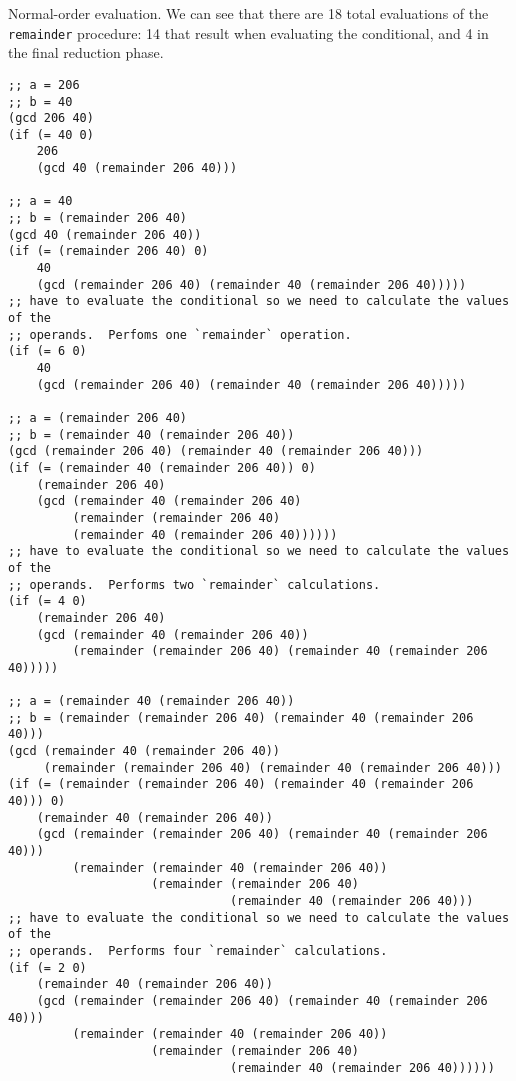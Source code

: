 \documentclass{article}
\begin{document}
\noindent Normal-order evaluation.  We can see that there are 18 total
evaluations of the \lstinline{remainder} procedure: 14 that result when
evaluating the conditional, and 4 in the final reduction phase.
\begin{lstlisting}[style=scheme]
;; a = 206
;; b = 40
(gcd 206 40)
(if (= 40 0)
    206
    (gcd 40 (remainder 206 40)))

;; a = 40
;; b = (remainder 206 40)
(gcd 40 (remainder 206 40))
(if (= (remainder 206 40) 0)
    40
    (gcd (remainder 206 40) (remainder 40 (remainder 206 40)))))
;; have to evaluate the conditional so we need to calculate the values of the
;; operands.  Perfoms one `remainder` operation.
(if (= 6 0)
    40
    (gcd (remainder 206 40) (remainder 40 (remainder 206 40)))))

;; a = (remainder 206 40)
;; b = (remainder 40 (remainder 206 40))
(gcd (remainder 206 40) (remainder 40 (remainder 206 40)))
(if (= (remainder 40 (remainder 206 40)) 0)
    (remainder 206 40)
    (gcd (remainder 40 (remainder 206 40)
         (remainder (remainder 206 40)
         (remainder 40 (remainder 206 40))))))
;; have to evaluate the conditional so we need to calculate the values of the
;; operands.  Performs two `remainder` calculations.
(if (= 4 0)
    (remainder 206 40)
    (gcd (remainder 40 (remainder 206 40))
         (remainder (remainder 206 40) (remainder 40 (remainder 206 40)))))

;; a = (remainder 40 (remainder 206 40))
;; b = (remainder (remainder 206 40) (remainder 40 (remainder 206 40)))
(gcd (remainder 40 (remainder 206 40))
     (remainder (remainder 206 40) (remainder 40 (remainder 206 40)))
(if (= (remainder (remainder 206 40) (remainder 40 (remainder 206 40))) 0)
    (remainder 40 (remainder 206 40))
    (gcd (remainder (remainder 206 40) (remainder 40 (remainder 206 40)))
         (remainder (remainder 40 (remainder 206 40))
                    (remainder (remainder 206 40)
                               (remainder 40 (remainder 206 40)))
;; have to evaluate the conditional so we need to calculate the values of the
;; operands.  Performs four `remainder` calculations.
(if (= 2 0)
    (remainder 40 (remainder 206 40))
    (gcd (remainder (remainder 206 40) (remainder 40 (remainder 206 40)))
         (remainder (remainder 40 (remainder 206 40))
                    (remainder (remainder 206 40)
                               (remainder 40 (remainder 206 40))))))


\end{lstlisting}
\end{document}
